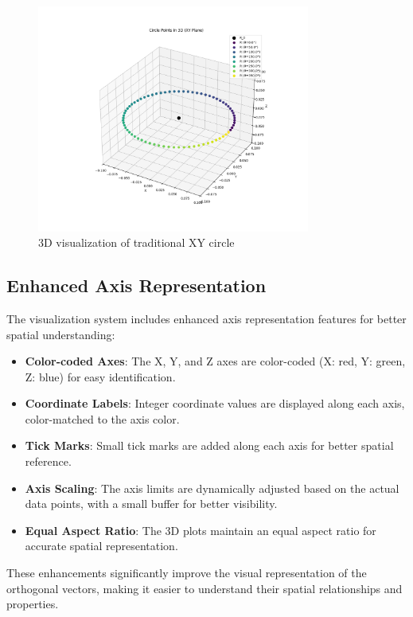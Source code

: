 \begin{figure}[H]
    \centering
    \includegraphics[width=0.8\textwidth]{figures/3d_xy_circle.png}
    \caption{3D visualization of traditional XY circle}
    \label{fig:vis_3d_xy_circle}
\end{figure}

\subsection{Enhanced Axis Representation}

The visualization system includes enhanced axis representation features for better spatial understanding:

\begin{itemize}
    \item \textbf{Color-coded Axes}: The X, Y, and Z axes are color-coded (X: red, Y: green, Z: blue) for easy identification.
    \item \textbf{Coordinate Labels}: Integer coordinate values are displayed along each axis, color-matched to the axis color.
    \item \textbf{Tick Marks}: Small tick marks are added along each axis for better spatial reference.
    \item \textbf{Axis Scaling}: The axis limits are dynamically adjusted based on the actual data points, with a small buffer for better visibility.
    \item \textbf{Equal Aspect Ratio}: The 3D plots maintain an equal aspect ratio for accurate spatial representation.
\end{itemize}

These enhancements significantly improve the visual representation of the orthogonal vectors, making it easier to understand their spatial relationships and properties.

